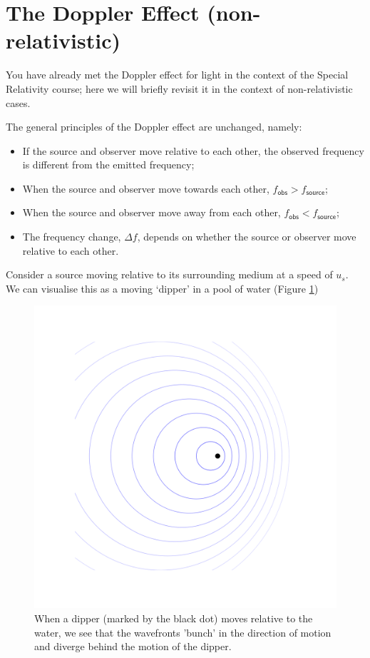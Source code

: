 \documentclass[
]{book}
\providecommand{\tightlist}{%
  \setlength{\itemsep}{0pt}\setlength{\parskip}{0pt}}
\begin{document}
\hypertarget{sec:ch9-dopplereffect1}{%
\section{The Doppler Effect (non-relativistic)}\label{sec:ch9-dopplereffect1}}

You have already met the Doppler effect for light in the context of the Special Relativity course; here we will briefly revisit it in the context of non-relativistic cases.

The general principles of the Doppler effect are unchanged, namely:

\begin{itemize}
\tightlist
\item
  If the source and observer move relative to each other, the observed frequency is different from the emitted frequency;
\item
  When the source and observer move towards each other, \(f_{\textsf{obs}} > f_{\textsf{source}}\);
\item
  When the source and observer move away from each other, \(f_{\textsf{obs}} < f_{\textsf{source}}\);
\item
  The frequency change, \(\Delta f\), depends on whether the source or observer move relative to each other.
\end{itemize}

Consider a source moving relative to its surrounding medium at a speed of \(u_s\). We can visualise this as a moving `dipper' in a pool of water (Figure \ref{fig:ch9-dopplerdipper1})

\begin{figure}

{\centering \includegraphics[width=0.7\linewidth]{visualisations/ch9-doppler1} 

}

\caption{When a dipper (marked by the black dot) moves relative to the water, we see that the wavefronts 'bunch' in the direction of motion and diverge behind the motion of the dipper.}\label{fig:ch9-dopplerdipper1}
\end{figure}
\end{document}
